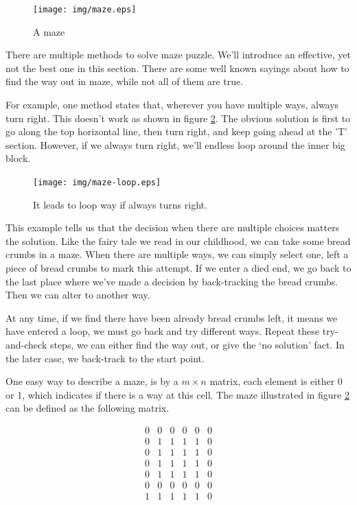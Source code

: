 \documentclass[UTF8]{article}
\begin{document}
\begin{figure}[htbp]
 \centering
 \texttt{[image: img/maze.eps]}
 \caption{A maze}
 \label{fig:maze}
\end{figure}

There are multiple methods to solve maze puzzle. We'll introduce an effective, yet not the best one in this
section. There are some well known sayings about how to find the way out in maze, while not all of them are
true.

For example, one method states that, wherever you have multiple ways, always turn right. This doesn't work
as shown in figure \ref{fig:maze-loop}. The obvious solution is first to go along the top horizontal line,
then turn right,
and keep going ahead at the 'T' section. However, if we always turn right, we'll endless
loop around the inner big block.

\begin{figure}[htbp]
 \centering
 \texttt{[image: img/maze-loop.eps]}
 \caption{It leads to loop way if always turns right.}
 \label{fig:maze-loop}
\end{figure}

This example tells us that the decision when there are multiple choices matters the solution. Like the
fairy tale we read in our childhood, we can take some bread crumbs in a maze. When there
are multiple ways, we can simply select one, left a piece of bread crumbs to mark this attempt.
If we enter a died end, we go back to the last place where
we've made a decision by back-tracking the bread crumbs. Then we can alter to another way.

At any time, if we find there have been already bread crumbs left, it means we have entered a loop, we
must go back and try different ways. Repeat these try-and-check steps, we can either find the way
out, or give the `no solution' fact. In the later case, we back-track to the start point.

One easy way to describe a maze, is by a $m \times n$ matrix, each element is either 0 or 1, which
indicates if there is a way at this cell. The maze
illustrated in figure \ref{fig:maze-loop} can be defined as the following matrix.

\[
\begin{matrix}
0 & 0 & 0 & 0 & 0 & 0 \\
0 & 1 & 1 & 1 & 1 & 0 \\
0 & 1 & 1 & 1 & 1 & 0 \\
0 & 1 & 1 & 1 & 1 & 0 \\
0 & 1 & 1 & 1 & 1 & 0 \\
0 & 0 & 0 & 0 & 0 & 0 \\
1 & 1 & 1 & 1 & 1 & 0
\end{matrix}
\]
\end{document}
